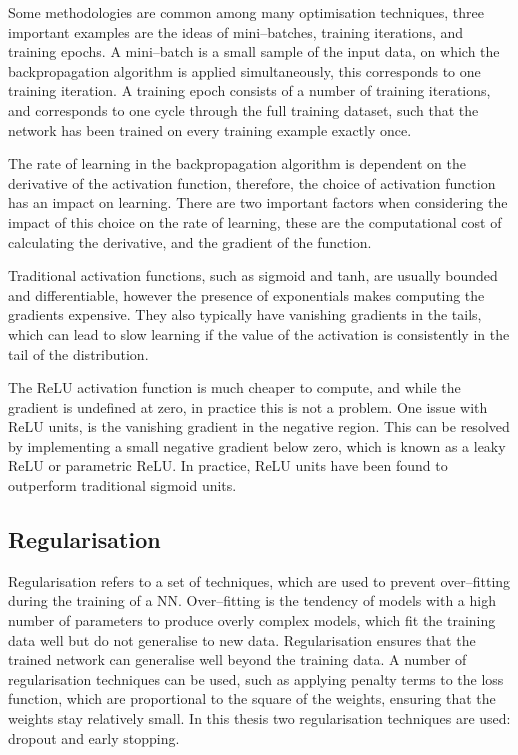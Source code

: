 Some methodologies are common among many optimisation techniques, three 
important examples are the ideas of mini--batches, training iterations, and 
training epochs. A mini--batch is a small sample of the input data, on which 
the backpropagation algorithm is applied simultaneously, this corresponds to 
one training iteration. A training epoch consists of a number of training 
iterations, and corresponds to one cycle through the full training dataset, 
such that the network has been trained on every training example exactly 
once.

\bigskip\noindent
The rate of learning in the backpropagation algorithm is dependent on the
derivative of the activation function, therefore, the choice of activation
function has an impact on learning. There are two important factors when
considering the impact of this choice on the rate of learning, these are the 
computational cost of calculating the derivative, and the gradient of the 
function. 

Traditional activation functions, such as sigmoid and tanh, are usually 
bounded and differentiable, however the presence of exponentials makes 
computing the gradients expensive. They also typically have vanishing 
gradients in the tails, which can lead to slow learning if the value of the 
activation is consistently in the tail of the distribution. 

The ReLU activation function is much cheaper to compute, and while the 
gradient is undefined at zero, in practice this is not a problem. One issue 
with ReLU units, is the vanishing gradient in the negative region. This can be 
resolved by implementing a small negative gradient below zero, which is known 
as a leaky ReLU or parametric ReLU\cite{He2015}. In practice, ReLU units have 
been found to outperform traditional sigmoid 
units\cite{Maas13rectifiernonlinearities, 10.5555/3104322.3104425}.

\subsection{Regularisation}
Regularisation refers to a set of techniques, which are used to prevent
over--fitting during the training of a NN. Over--fitting is the tendency
of models with a high number of parameters to produce overly complex models,
which fit the training data well but do not generalise to new data.
Regularisation ensures that the trained network can generalise well beyond the 
training data. A number of regularisation techniques can be used, such as 
applying penalty terms to the loss function, which are proportional to the 
square of the weights, ensuring that the weights stay relatively small. In 
this thesis two regularisation techniques are used: 
dropout\cite{Srivastava2014DropoutAS} and early 
stopping\cite{OrrGenevieveB.1998NNTo}.

